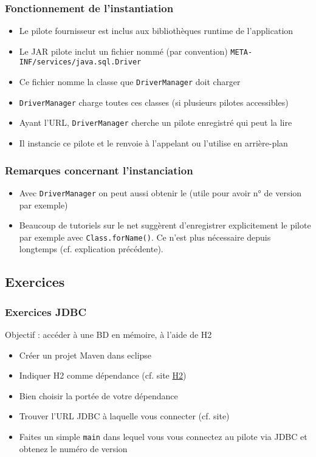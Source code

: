 \documentclass[english, french]{beamer}
\begin{document}
\begin{frame}
	\frametitle{Fonctionnement de l’instantiation}
	\begin{itemize}
		\item Le pilote fournisseur est inclus aux bibliothèques runtime de l’application
		\item Le JAR pilote inclut un fichier nommé (par convention) \texttt{META-INF/services/java.sql.Driver}
		\item Ce fichier nomme la classe que \texttt{DriverManager} doit charger
		\item \texttt{DriverManager} charge toutes ces classes (si plusieurs pilotes accessibles)
		\item Ayant l’URL, \texttt{DriverManager} cherche un pilote enregistré qui peut la lire
		\item Il instancie ce pilote et le renvoie à l’appelant ou l’utilise en arrière-plan
	\end{itemize}
	
\end{frame}

\begin{frame}
	\frametitle{Remarques concernant l’instanciation}
	\begin{itemize}
		\item Avec \texttt{DriverManager} on peut aussi obtenir le  (utile pour avoir n° de version par exemple)
		\item Beaucoup de tutoriels sur le net suggèrent d’enregistrer explicitement le pilote {\tiny par exemple avec \texttt{Class.forName()}}. Ce n’est plus nécessaire depuis longtemps (cf. explication précédente).
	\end{itemize}
\end{frame}

\subsection{Exercices}
\begin{frame}%
	\frametitle{Exercices JDBC}
	Objectif : accéder à une BD en mémoire, à l’aide de H2
	\begin{itemize}
		\item Créer un projet Maven dans eclipse
		\item Indiquer H2 comme dépendance (cf. site \href{http://www.h2database.com}{H2})
		\item Bien choisir la portée de votre dépendance
		\item Trouver l’URL JDBC à laquelle vous connecter (cf. site)
		\item Faites un simple \texttt{main} dans lequel vous vous connectez au pilote via JDBC et obtenez le numéro de version
	\end{itemize}
\end{frame}
\end{document}
